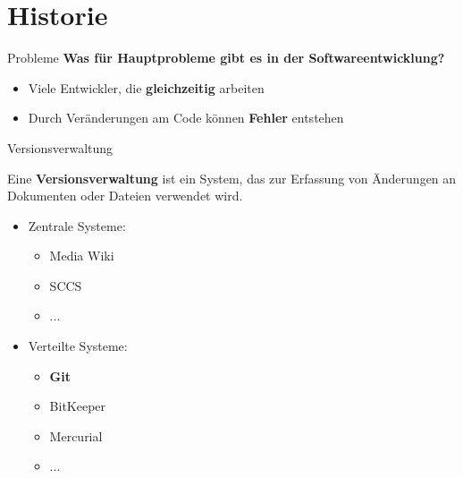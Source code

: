 \section{Historie}

\begin{frame}{Probleme}
  \textbf{Was für Hauptprobleme gibt es in der Softwareentwicklung?}
  \begin{itemize}
    \pause
    \item Viele Entwickler, die \textbf{gleichzeitig} arbeiten
    \pause
    \item Durch Veränderungen am Code können \textbf{Fehler} entstehen
  \end{itemize}

\end{frame}

\begin{frame}{Versionsverwaltung}
  \begin{Definition}
    Eine \textbf{Versionsverwaltung} ist ein System, das zur Erfassung von Änderungen an Dokumenten oder Dateien verwendet wird. \cite{WVW}
  \end{Definition}

  \begin{itemize}
    \pause
    \item Zentrale Systeme:
      \begin{itemize}
        \item Media Wiki
        \item SCCS
        \item ...
      \end{itemize}
    \pause
    \item Verteilte Systeme:
      \begin{itemize}
        \item \textbf{Git}\cite{WGIT}
        \item BitKeeper
        \item Mercurial
        \item ...
      \end{itemize}
  \end{itemize}
  
\end{frame}

